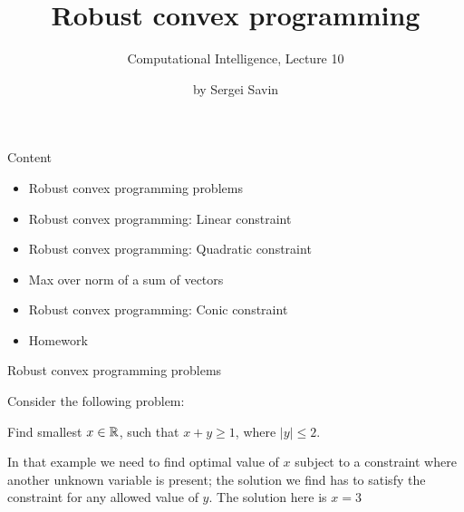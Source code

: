 \documentclass{beamer}
\title{ Robust convex programming }
\subtitle{Computational Intelligence, Lecture 10}
\author{by Sergei Savin}
\date{\mydate}
\begin{document}
\maketitle



\begin{frame}{Content}

\begin{itemize}
 \item Robust convex programming problems
 \item Robust convex programming: Linear constraint
 \item Robust convex programming: Quadratic constraint
 \item Max over norm of a sum of vectors
 \item Robust convex programming: Conic constraint
\item Homework
\end{itemize}

\end{frame}



\begin{frame}{Robust convex programming problems}
\begin{flushleft}

Consider the following problem: 

\begin{example}
Find smallest $x \in \mathbb{R}$, such that $x + y \geq 1$, where $|y| \leq 2$.
\end{example}

\bigskip

In that example we need to find optimal value of $x$ subject to a constraint where another unknown variable is present; the solution we find has to satisfy the constraint for any allowed value of $y$. The solution here is $x = 3$

 
\end{flushleft}
\end{frame}
\end{document}

